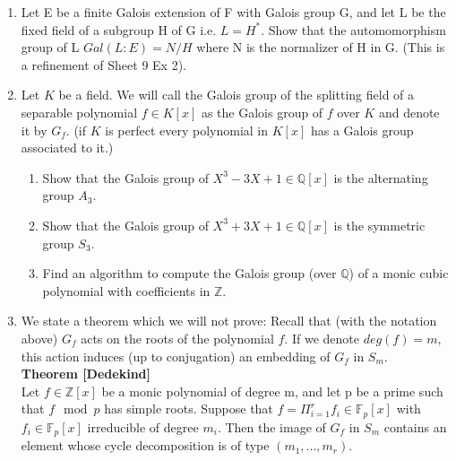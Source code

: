 \documentclass[12pt,a4paper]{article}
\begin{document}
 
\noindent


\begin{enumerate}
\item 
Let E be a finite Galois extension of F with Galois group G, and let L be the fixed field of a subgroup H of G i.e. $L=H^*$. Show that the automomorphism group of L $Gal(L:E)=N/H$ where N is the normalizer of H in G. (This is a refinement of Sheet 9 Ex 2).

\item 
Let $K$ be a field. We will call the Galois group of the splitting field of a separable polynomial $f\in K[x]$ as the Galois group of $f$ over $K$ and denote it by $G_f$. (if $K$ is perfect every polynomial in $K[x]$ has a Galois group associated to it.)
\begin{enumerate}
    \item Show that the Galois group of $X^3-3X+1\in\mathbb{Q}[x]$ is the alternating group $A_3$.
    \item Show that the Galois group of $X^3+3X+1\in\mathbb{Q}[x]$ is the symmetric group $S_3$.
    \item Find an algorithm to compute the Galois group (over $\mathbb{Q}$) of a monic cubic polynomial with coefficients in $\mathbb{Z}$. 
\end{enumerate}{}

\item 
We state a theorem which we will not prove: Recall that (with the notation above) $G_f$ acts on the roots of the polynomial $f$. If we denote $deg(f)=m$, this action induces (up to conjugation) an embedding of $G_f$ in $S_m$.\\

\textbf{Theorem [Dedekind]}\\

Let $f\in\mathbb{Z}[x]$ be a monic polynomial of degree m, and let p be a prime such that $f \mod p$ has simple roots. Suppose that $f=\Pi_{i=1}^{r} f_i \in \mathbb{F}_p[x]$ with $f_i\in\mathbb{F}_p[x]$ irreducible of degree $m_i$. Then the image of $G_f$ in $S_m$ contains an element whose cycle decomposition is of type $(m_1,...,m_r)$.\\


\end{enumerate}
\end{document}
